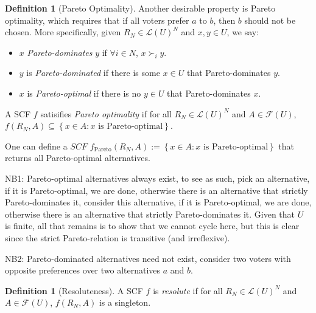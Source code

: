\documentclass{book}
\theoremstyle{plain}
\theoremstyle{definition}
\newtheorem{definition}[theorem]{Definition}
\theoremstyle{remark}
\newcommand{\set}[1]{\left\{#1\right\}}
\begin{document}
\begin{definition}[Pareto Optimality]
    Another desirable property is Pareto optimality, which requires that if all voters prefer $a$ to $b$, then $b$ should not be chosen.
    More specifically,
    given $R_N \in \mathcal{L}(U)^N$ and $x, y \in U$, we say:
    \begin{itemize}
        \item $x$ \emph{Pareto-dominates} $y$ if $\forall i \in N$, $x \succ_i y$.
        \item $y$ is \emph{Pareto-dominated} if there is some $x \in U$ that Pareto-dominates $y$.
        \item $x$ is \emph{Pareto-optimal} if there is no $y \in U$ that Pareto-dominates $x$.
    \end{itemize}

    A SCF $f$ satisifies \emph{Pareto optimality}
    if for all $R_N \in \mathcal{L}(U)^N$ and $A \in \mathcal{F}(U)$, $f(R_N, A) \subseteq \set{x \in A : x \text{ is Pareto-optimal}}$.

    One can define a $SCF$ $f_{\text{Pareto}}(R_N, A) := \set{x \in A : x \text{ is Pareto-optimal}}$ that returns all Pareto-optimal alternatives.

    NB1: Pareto-optimal alternatives always exist, 
    to see as such, 
    pick an alternative,
    if it is Pareto-optimal, we are done, otherwise there is an alternative that strictly Pareto-dominates it,
    consider this alternative, if it is Pareto-optimal, we are done, otherwise there is an alternative that strictly Pareto-dominates it.
    Given that $U$ is finite, all that remains is to show that we cannot cycle here, 
    but this is clear since the strict Pareto-relation is transitive (and irreflexive).


    NB2: Pareto-dominated alternatives need not exist,
    consider two voters with opposite preferences over two alternatives $a$ and $b$.
\end{definition}


\begin{definition}[Resoluteness]
    A SCF $f$ is \emph{resolute} if for all $R_N \in \mathcal{L}(U)^N$ and $A \in \mathcal{F}(U)$, $f(R_N, A)$ is a singleton.
\end{definition}
\end{document}
